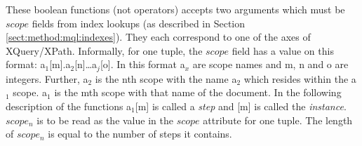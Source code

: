 These boolean functions (not operators) accepts two arguments which must be $scope$ fields from index lookups (as
described in Section \ref{sect:method:mql:indexes}). They each correspond to one of the axes of XQuery/XPath.
Informally, for one tuple, the $scope$ field has a value on this format:
\textsf{a}$_1$\textsf{[m].}\textsf{a}$_2$\textsf{[n]\ldots}\textsf{a}$_j$\textsf{[o]}. In this format
\textsf{a}$_x$ are scope names and \textsf{m}, \textsf{n} and \textsf{o} are integers. Further, \textsf{a}$_2$ is
the \textsf{n}th scope with the name \textsf{a}$_2$ which resides within the \textsf{a}$_1$ scope. \textsf{a}$_1$
is the \textsf{m}th scope with that name of the document. In the following description of the functions
\textsf{a}$_1$\textsf{[m]} is called a \emph{step} and \textsf{[m]} is called the \emph{instance}. $scope_n$ is to
be read as the value in the $scope$ attribute for one tuple. The length of $scope_n$ is equal to the number of
steps it contains.

